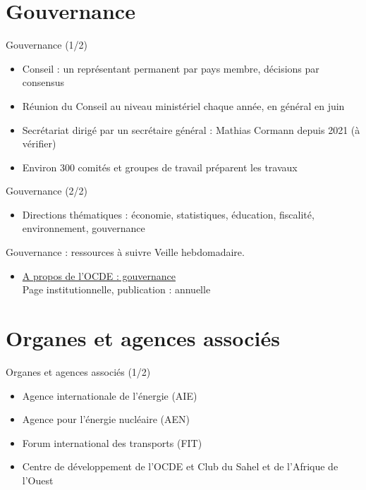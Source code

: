 \documentclass[aspectratio=169,11pt]{beamer}
\begin{document}
\section{Gouvernance}
\begin{frame}{Gouvernance (1/2)}
\begin{itemize}
\item Conseil : un représentant permanent par pays membre, décisions par consensus
\item Réunion du Conseil au niveau ministériel chaque année, en général en juin
\item Secrétariat dirigé par un secrétaire général : Mathias Cormann depuis 2021 (à vérifier)
\item Environ 300 comités et groupes de travail préparent les travaux
\end{itemize}
\end{frame}

\begin{frame}{Gouvernance (2/2)}
\begin{itemize}
\item Directions thématiques : économie, statistiques, éducation, fiscalité, environnement, gouvernance
\end{itemize}
\end{frame}

\begin{frame}{Gouvernance : ressources à suivre}
\small
Veille hebdomadaire.
\begin{itemize}
\item \href{https://www.oecd.org/en/about.html}{A propos de l'OCDE : gouvernance}\\{\footnotesize Page institutionnelle, publication : annuelle}
\end{itemize}
\end{frame}

\section{Organes et agences associés}
\begin{frame}{Organes et agences associés (1/2)}
\begin{itemize}
\item Agence internationale de l'énergie (AIE)
\item Agence pour l'énergie nucléaire (AEN)
\item Forum international des transports (FIT)
\item Centre de développement de l'OCDE et Club du Sahel et de l'Afrique de l'Ouest
\end{itemize}
\end{frame}
\end{document}
